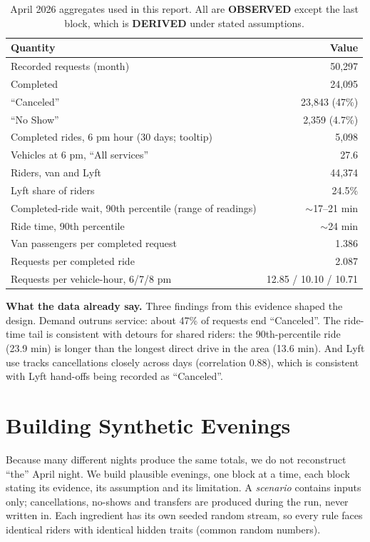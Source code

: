 \documentclass{article}
\newcommand{\lab}[1]{{\footnotesize\textsf{\textbf{#1}}}}
\newcommand{\OBS}{\lab{OBSERVED}}
\newcommand{\DER}{\lab{DERIVED}}
\begin{document}
\begin{table}[t]
\centering\small
\caption{April 2026 aggregates used in this report. All are \OBS{} except the last block, which is \DER{} under stated assumptions.}\label{tab:april}
\begin{tabularx}{\columnwidth}{@{}Lr@{}}
\toprule
\textbf{Quantity} & \textbf{Value}\\
\midrule
Recorded requests (month) & 50,297\\
Completed & 24,095\\
``Canceled'' & 23,843 (47\%)\\
``No Show'' & 2,359 (4.7\%)\\
Completed rides, 6 pm hour (30 days; tooltip) & 5,098\\
Vehicles at 6 pm, ``All services'' & 27.6\\
Riders, van and Lyft & 44,374\\
Lyft share of riders & 24.5\%\\
Completed-ride wait, 90th percentile (range of readings) & $\sim$17--21 min\\
Ride time, 90th percentile & $\sim$24 min\\
\midrule
Van passengers per completed request & 1.386\\
Requests per completed ride & 2.087\\
Requests per vehicle-hour, 6/7/8 pm & 12.85 / 10.10 / 10.71\\
\bottomrule
\end{tabularx}
\end{table}

\textbf{What the data already say.} Three findings from this evidence shaped the design. Demand outruns service: about 47\% of requests end ``Canceled''. The ride-time tail is consistent with detours for shared riders: the 90th-percentile ride (23.9 min) is longer than the longest direct drive in the area (13.6 min). And Lyft use tracks cancellations closely across days (correlation 0.88), which is consistent with Lyft hand-offs being recorded as ``Canceled''.

\section{Building Synthetic Evenings}\label{sec:scenario}

Because many different nights produce the same totals, we do not reconstruct ``the'' April night. We build plausible evenings, one block at a time, each block stating its evidence, its assumption and its limitation. A \emph{scenario} contains inputs only; cancellations, no-shows and transfers are produced during the run, never written in. Each ingredient has its own seeded random stream, so every rule faces identical riders with identical hidden traits (common random numbers).
\end{document}
